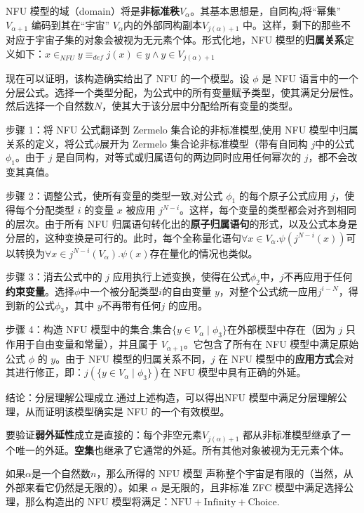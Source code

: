 NFU 模型的域（domain）将是\textbf{非标准秩}\( V_{\alpha} \)。其基本思想是，自同构\( j \)将“幂集” \( V_{\alpha+1} \) 编码到其在“宇宙” \( V_{\alpha} \)内的外部同构副本\( V_{j(\alpha)+1} \) 中。这样，剩下的那些不对应于宇宙子集的对象会被视为无元素个体。形式化地，NFU 模型的\textbf{归属关系}定义如下：\(x \in_{NFU} y \equiv_{def} j(x) \in y \wedge y \in V_{j(\alpha) + 1}\)

现在可以证明，该构造确实给出了 NFU 的一个模型。设 \( \phi \) 是 NFU 语言中的一个分层公式。选择一个类型分配，为公式中的所有变量赋予类型，使其满足分层性。然后选择一个自然数\( N \)，使其大于该分层中分配给所有变量的类型。

步骤 1：将 NFU 公式翻译到 Zermelo 集合论的非标准模型,使用 NFU 模型中归属关系的定义，将公式\( \phi \)展开为 Zermelo 集合论非标准模型（带有自同构 \( j \)中的公式\( \phi_1 \)。由于 \( j \) 是自同构，对等式或归属语句的两边同时应用任何幂次的 \( j \)，都不会改变其真值。  

步骤 2：调整公式，使所有变量的类型一致,对公式 \( \phi_1 \) 的每个原子公式应用 \( j \)，使得每个分配类型 \( i \) 的变量 \( x \) 被应用 \( j^{N-i} \)。这样，每个变量的类型都会对齐到相同的层次。由于所有 NFU 归属语句转化出的\textbf{原子归属语句}的形式，以及公式本身是分层的，这种变换是可行的。此时，每个全称量化语句\(\forall x \in V_{\alpha}.\psi(j^{N-i}(x))\)可以转换为\(\forall x \in j^{N-i}(V_{\alpha}).\psi(x)\)存在量化的情况也类似。  

步骤 3：消去公式中的 \( j \) 应用执行上述变换，使得在公式\( \phi_2 \)中，\( j \)不再应用于任何\textbf{约束变量}。选择\( \phi \)中一个被分配类型\( i \)的自由变量 \( y \)，对整个公式统一应用\( j^{i-N} \)，得到新的公式\( \phi_3 \)，其中 \( y \)不再带有任何\( j \) 的应用。  

步骤 4：构造 NFU 模型中的集合,集合\(\{ y \in V_{\alpha} \mid \phi_3 \}\)在外部模型中存在（因为 \( j \) 只作用于自由变量和常量），并且属于 \(V_{\alpha+1} \)。它包含了所有在 NFU 模型中满足原始公式 \( \phi \) 的 \( y \)。由于 NFU 模型的归属关系不同，\( j \) 在 NFU 模型中的\textbf{应用方式}会对其进行修正，即：\(j(\{ y \in V_{\alpha} \mid \phi_3 \})\)在 NFU 模型中具有正确的外延。  

结论：分层理解公理成立.通过上述构造，可以得出NFU 模型中满足分层理解公理，从而证明该模型确实是 NFU 的一个有效模型。

要验证\textbf{弱外延性}成立是直接的：每个非空元素\( V_{j(\alpha)+1} \) 都从非标准模型继承了一个唯一的外延。\textbf{空集}也继承了它通常的外延。所有其他对象被视为无元素个体。  

如果\( \alpha \)是一个自然数\( n \)，那么所得的 NFU 模型 声称整个宇宙是有限的（当然，从外部来看它仍然是无限的）。如果 \( \alpha \) 是无限的，且非标准 ZFC 模型中满足选择公理，那么构造出的 NFU 模型将满足：\(\text{NFU} + \text{Infinity} + \text{Choice}\).
